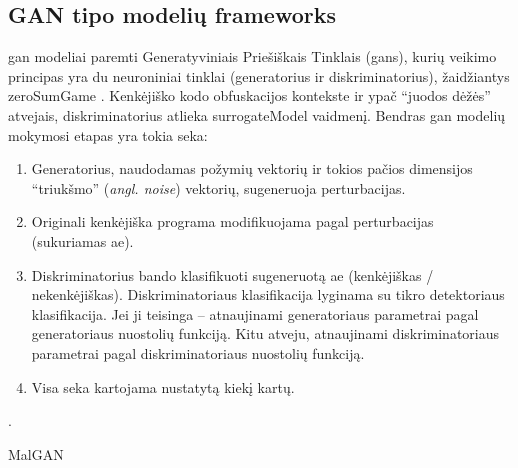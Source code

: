 \subsection{GAN tipo modelių \glspl{framework}}\label{sec:literature:gan}

\acs{gan} modeliai paremti Generatyviniais Priešiškais Tinklais (\aclp{gan}), kurių veikimo principas yra du neuroniniai tinklai (generatorius ir diskriminatorius), žaidžiantys \gls{zeroSumGame} \citeplace. Kenkėjiško kodo obfuskacijos kontekste ir ypač \enquote{juodos dėžės} atvejais, diskriminatorius atlieka \gls{surrogateModel} vaidmenį. Bendras \ac{gan} modelių mokymosi etapas yra tokia seka:
\begin{enumerate}
    \item Generatorius, naudodamas požymių vektorių ir tokios pačios dimensijos
          \enquote{triukšmo} (\textit{angl. noise}) vektorių, sugeneruoja perturbacijas.
    \item Originali kenkėjiška programa modifikuojama pagal perturbacijas (sukuriamas
          \ac{ae}).
    \item Diskriminatorius bando klasifikuoti sugeneruotą \ac{ae} (kenkėjiškas /
          nekenkėjiškas). Diskriminatoriaus klasifikacija lyginama su tikro detektoriaus
          klasifikacija. Jei ji teisinga -- atnaujinami generatoriaus parametrai pagal
          generatoriaus nuostolių funkciją. Kitu atveju, atnaujinami diskriminatoriaus
          parametrai pagal diskriminatoriaus nuostolių funkciją.
    \item Visa seka kartojama nustatytą kiekį kartų.
\end{enumerate} \citeplace.

\begin{describeModel}{MalGAN}{\cite{huGeneratingAdversarialMalware2017}}
\end{describeModel}
